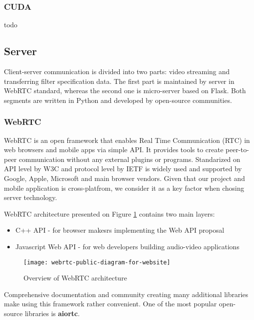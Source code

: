 \documentclass[../Main.tex]{subfiles}
\begin{document}
    \subsubsection{CUDA}
    todo
    
\newpage
\subsection{Server}
    Client-server communication is divided into two parts: video streaming and transferring filter specification data. The first part is maintained by server in WebRTC standard, whereas the second one is micro-server based on Flask. Both segments are written in Python and developed by open-source communities.

    \subsubsection{WebRTC}
    WebRTC is an open framework that enables Real Time Communication (RTC) in web browsers and mobile apps via simple API. It provides tools to create peer-to-peer communication without any external plugins or programs. Standarized on API level by W3C 
    and protocol level by IETF 
    is widely used and supported by Google, Apple, Microsoft and main browser vendors. Given that our project and mobile application is cross-platfrom, we consider it as a key factor when chosing server technology.
    
    WebRTC architecture presented on  Figure \ref{fig:webrtc-public-diagram-for-website} contains two main layers: 
    \begin{itemize}
    \item C++ API - for browser makesrs implementing the Web API proposal
    \item Javascript Web API - for web developers building audio-video applications \\
    \end{itemize}
    
    \begin{figure}[h]
    \centering
    \texttt{[image: webrtc-public-diagram-for-website]}
    \caption{Overview of WebRTC architecture}
    \label{fig:webrtc-public-diagram-for-website}
    \end{figure}

    Comprehensive documentation and community creating many additional libraries make using this framework rather convenient. One of the most popular open-source libraries is \textbf{aiortc}.
    
\end{document}
